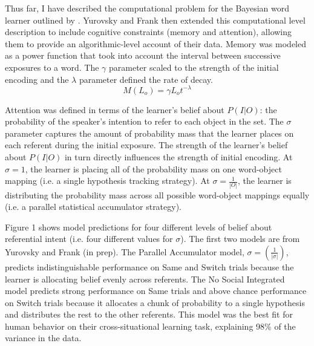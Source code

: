 \documentclass[man]{apa2}
\begin{document}
Thus far, I have described the computational problem for the Bayesian word learner outlined by . Yurovsky and Frank then extended this computational level description to include cognitive constraints (memory and attention), allowing them to provide an algorithmic-level account of their data. Memory was modeled as a power function that took into account the interval between successive exposures to a word. The $\gamma$ parameter scaled to the strength of the initial encoding and the $\lambda$ parameter defined the rate of decay.
%
\begin{equation}
\label{4}
M(L_o) =  \gamma L_ot^{-\lambda}
\end{equation}
%

Attention was defined in terms of the learner's belief about $P(I|O)$: the probability of the speaker's intention to refer to each object in the set. The $\sigma$ parameter captures the amount of probability mass that the learner  places on each referent during the initial exposure. The strength of the learner's belief about $P(I|O)$ in turn directly influences the strength of initial encoding. At $\sigma = 1$, the learner is placing all of the probability mass on one word-object mapping (i.e. a single hypothesis tracking strategy). At $\sigma = \frac{1}{|O|}$, the learner is distributing the probability mass across all possible word-object mappings equally (i.e. a parallel statistical accumulator strategy). 

Figure 1 shows model predictions for four different levels of belief about referential intent (i.e. four different values for $\sigma$). The first two models are from Yurovsky and Frank (in prep). The Parallel Accumulator model, $\sigma = (\frac{1}{|\sigma|})$, predicts indistinguishable performance on Same and Switch trials because the learner is allocating belief evenly across referents. The No Social Integrated model predicts strong performance on Same trials and above chance performance on Switch trials because it allocates a chunk of probability to a single hypothesis and distributes the rest to the other referents. This model was the best fit for human behavior on their cross-situational learning task, explaining 98\% of the variance in the data. 
\end{document}
